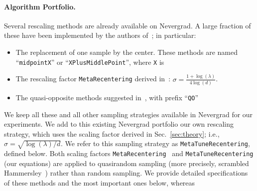 \paragraph{Algorithm Portfolio.}
Several rescaling methods are already available on Nevergrad. A large fraction of these have been implemented by the authors of~\cite{icmldoe}; in particular:
\begin{itemize}
    \item The replacement of one sample by the center. These methods are named ``\texttt{midpointX}'' or ``\texttt{XPlusMiddlePoint}'', where \texttt{X} is  
    \item The rescaling factor \texttt{MetaRecentering} derived in~\cite{icmldoe}: $\sigma = \frac{1+\log(\lambda)}{4\log(d)}$.
    \item The quasi-opposite methods suggested in~\cite{centerbased}, with prefix ``\texttt{QO}''
    \end{itemize}%
We keep all these and all other sampling strategies available in Nevergrad for our experiments.   %
We add to this existing Nevergrad portfolio our own rescaling strategy, which uses the scaling factor derived in Sec.~\ref{sec:theory}; i.e.,  $\sigma = \sqrt{\log(\lambda)/d}$. We refer to this sampling strategy as \texttt{MetaTuneRecentering}, defined below.
Both scaling factors \texttt{MetaRecentering}~\cite{icmldoe} and \texttt{MetaTuneRecentering} (our equations) are applied to quasirandom sampling (more precisely, scrambled Hammersley~\cite{hammersley,atanasov}) rather than random sampling. We provide detailed specifications of these methods and the most important ones below, whereas 
